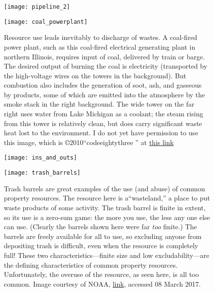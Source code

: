 \newpage
\begin{figure}[p]
\centering
  \texttt{[image: pipeline\_2]}%

\caption{ }
\label{fig:pipelines_2}
\end{figure}


\newpage
\begin{figure}[p]
\centering
  \texttt{[image: coal\_powerplant]}%

\caption{Resource use leads inevitably to  discharge of wastes. A coal-fired power plant, such as this coal-fired electrical generating plant in northern Illinois, requires input of coal, delivered by train or barge. The desired output of burning the coal is electricity (transported by the high-voltage wires on the towers in the background). But combustion also includes the generation of soot, ash, and gasseous by products, some of which are emitted into the atmosphere by the smoke stack in the right background. The wide tower on the far right uses water from Lake Michigan as a coolant; the steam rising from this tower is relatively clean, but does carry significant waste heat lost to the environment. I do not yet have permission to use this image, which is \copyright 2010``codeeightythree
'' at \href{https://www.flickr.com/photos/railpictures/4316794283/in/photostream/}{this link}}
\label{fig:coal_powerplant}
\end{figure}

\newpage
\begin{figure}[p]
\centering
  \texttt{[image: ins\_and\_outs]}%
\caption{}
\label{fig:ins_and_outs}
\end{figure}

\newpage
\begin{figure}[p]
\centering
  \texttt{[image: trash\_barrels]}%

\caption{Trash barrels are great examples of the use (and abuse) of common property resources. The resource here is a``wasteland,'' a place to put waste products of some activity. The trash barrel is finite in extent, so its use is a zero-sum game: the more you use, the less any one else can use. (Clearly the barrels shown here were far \emph{too} finite.) The barrels are freely available for all to use, so excluding anyone from depositing trash is difficult, even when the resource is completely full! These two characteristics---finite size and low excludability---are the defining characteristics of common property resources. Unfortunately, the overuse of the resource, as seen here, is all too common. Image courtesy of NOAA,  \href{https://marinedebrisblog.wordpress.com/tag/plastics/}{link}, accessed 08 March 2017.}
\label{fig:trash}
\end{figure}

